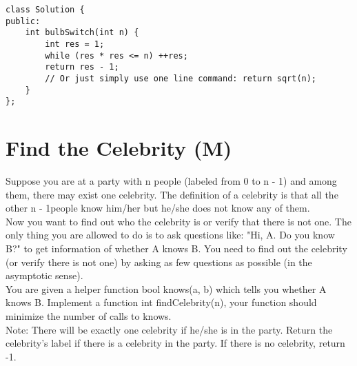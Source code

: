 \begin{lstlisting}
class Solution {
public:
    int bulbSwitch(int n) {
        int res = 1;
        while (res * res <= n) ++res;
        return res - 1;
        // Or just simply use one line command: return sqrt(n);
    }
};
\end{lstlisting}


\section{Find the Celebrity (M)}
Suppose you are at a party with n people (labeled from 0 to n - 1) and among them, there may exist one celebrity. The definition of a celebrity is that all the other n - 1people know him/her but he/she does not know any of them.\\

Now you want to find out who the celebrity is or verify that there is not one. The only thing you are allowed to do is to ask questions like: "Hi, A. Do you know B?" to get information of whether A knows B. You need to find out the celebrity (or verify there is not one) by asking as few questions as possible (in the asymptotic sense).\\

You are given a helper function bool knows(a, b) which tells you whether A knows B. Implement a function int findCelebrity(n), your function should minimize the number of calls to knows.\\

Note: There will be exactly one celebrity if he/she is in the party. Return the celebrity's label if there is a celebrity in the party. If there is no celebrity, return -1.\\

